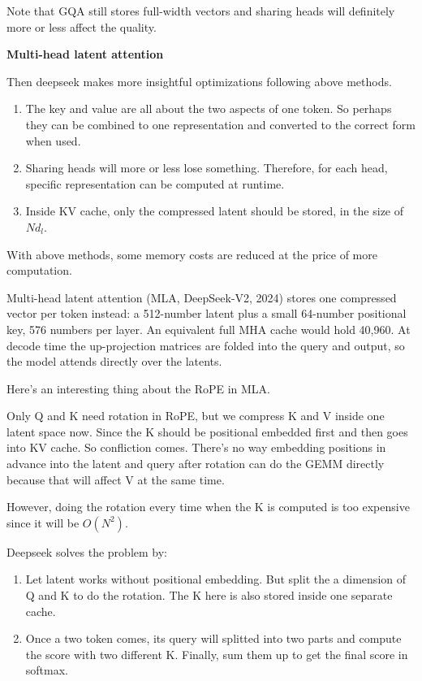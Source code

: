 \documentclass[11pt]{article}
\providecommand{\tightlist}{\setlength{\itemsep}{0pt}\setlength{\parskip}{0pt}}
\begin{document}
Note that GQA still stores full-width vectors and sharing heads will definitely more or less affect the quality.

\textbf{Multi-head latent attention}

Then deepseek makes more insightful optimizations following above methods.

\begin{enumerate}
\def\labelenumi{\arabic{enumi}.}
\tightlist
\item
  The key and value are all about the two aspects of one token. So perhaps they can be combined to one representation and converted to the correct form when used.
\item
  Sharing heads will more or less lose something. Therefore, for each head, specific representation can be computed at runtime.
\item
  Inside KV cache, only the compressed latent should be stored, in the size of \(N d_l\).
\end{enumerate}

With above methods, some memory costs are reduced at the price of more computation.

Multi-head latent attention (MLA, DeepSeek-V2, 2024) stores one compressed vector per token instead: a 512-number latent plus a small 64-number positional key, 576 numbers per layer. An equivalent full MHA cache would hold 40,960. At decode time the up-projection matrices are folded into the query and output, so the model attends directly over the latents.

Here's an interesting thing about the RoPE in MLA.

Only Q and K need rotation in RoPE, but we compress K and V inside one latent space now. Since the K should be positional embedded first and then goes into KV cache. So confliction comes. There's no way embedding positions in advance into the latent and query after rotation can do the GEMM directly because that will affect V at the same time.

However, doing the rotation every time when the K is computed is too expensive since it will be \(O(N^2)\).

Deepseek solves the problem by:

\begin{enumerate}
\def\labelenumi{\arabic{enumi}.}
\tightlist
\item
  Let latent works without positional embedding. But split the a dimension of Q and K to do the rotation. The K here is also stored inside one separate cache.
\item
  Once a two token comes, its query will splitted into two parts and compute the score with two different K. Finally, sum them up to get the final score in softmax.
\end{enumerate}
\end{document}
